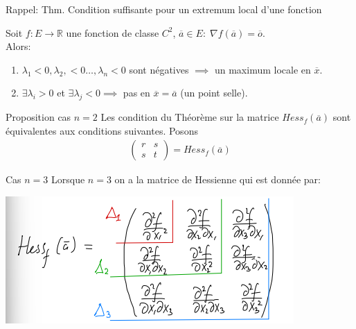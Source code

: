 
\begin{parag}{Rappel: Thm. Condition suffisante pour un extremum local d'une fonction}
    \begin{theoreme}
        Soit $f: E \to \mathbb{R}$ une fonction de classe $C^2$, $\overline{a} \in E: \; \nabla f \left( \overline{a}\right) = \overline{o}$.\\
        Alors:
        \begin{enumerate}
            \item $\lambda_1 < 0 , \lambda_2, < 0 \ldots, \lambda_n < 0$ sont négatives $\implies$ un maximum locale en $\overline{x}$.
            \item $\exists \lambda_i > 0$ et $\exists \lambda_j < 0 \implies$ pas  en $\overline{x} = \overline{a}$ (un point selle).
        \end{enumerate}
    \end{theoreme}
    
\end{parag}
\begin{parag}{Proposition cas $n = 2$}
    Les condition du Théorème sur la matrice $Hess_f\left(\overline{a}\right)$ sont équivalentes aux conditions suivantes. Posons  
    \begin{align*} \begin{pmatrix} r & s \\ s & t \end{pmatrix} = Hess_f\left(\overline{a}\right) \end{align*}

\end{parag}
\begin{parag}{Cas $n= 3$}
    Lorsque $n = 3$ on a la matrice de Hessienne qui est donnée par:
    \begin{center}
        \includegraphics[scale=1.2]{12025-04-30.png}
    \end{center}
\end{parag}


